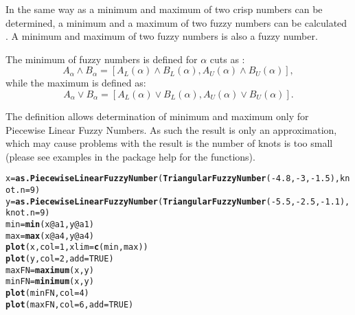 \documentclass[11pt]{article}\usepackage[]{graphicx}\usepackage[]{color}
\makeatletter
\newcommand{\hlnum}[1]{\textcolor[rgb]{0.686,0.059,0.569}{#1}}%
\newcommand{\hlopt}[1]{\textcolor[rgb]{0,0,0}{#1}}%
\newcommand{\hlstd}[1]{\textcolor[rgb]{0.345,0.345,0.345}{#1}}%
\newcommand{\hlkwb}[1]{\textcolor[rgb]{0.69,0.353,0.396}{#1}}%
\newcommand{\hlkwc}[1]{\textcolor[rgb]{0.333,0.667,0.333}{#1}}%
\newcommand{\hlkwd}[1]{\textcolor[rgb]{0.737,0.353,0.396}{\textbf{#1}}}%
\newenvironment{kframe}{%
 \def\at@end@of@kframe{}%
 \ifinner\ifhmode%
  \def\at@end@of@kframe{\end{minipage}}%
  \begin{minipage}{\columnwidth}%
 \fi\fi%
 \def\FrameCommand##1{\hskip\@totalleftmargin \hskip-\fboxsep
 \colorbox{shadecolor}{##1}\hskip-\fboxsep
     \hskip-\linewidth \hskip-\@totalleftmargin \hskip\columnwidth}%
 \MakeFramed {\advance\hsize-\width
   \@totalleftmargin\z@ \linewidth\hsize
   \@setminipage}}%
 {\par\unskip\endMakeFramed%
 \at@end@of@kframe}
\newenvironment{knitrout}{}{} %
\makeatother
\begin{document}
In the same way as a minimum and maximum of two crisp numbers can be determined, a minimum and a maximum of two fuzzy numbers can be calculated \cite{KaufmannGupta1985:fuzzybook}. A minimum and maximum of two fuzzy numbers is also a fuzzy number.

The minimum of fuzzy numbers is defined for $\alpha$ cuts as \cite{KaufmannGupta1985:fuzzybook}:
\begin{equation}
A_\alpha \wedge B_\alpha = [A_L(\alpha) \wedge B_L(\alpha), A_U(\alpha) \wedge B_U(\alpha)],
\end{equation}
while the maximum is defined as:
\begin{equation}
A_\alpha \vee B_\alpha = [A_L(\alpha) \vee B_L(\alpha), A_U(\alpha) \vee B_U(\alpha)].
\end{equation}


The definition allows determination of minimum and maximum only for Piecewise Linear Fuzzy Numbers. As such the result is only an approximation, which may cause problems with the result is the number of knots is too small (please see examples in the package help for the functions).

\begin{knitrout}\small
{}\color{fgcolor}\begin{kframe}
\begin{alltt}
\hlstd{x} \hlkwb{=} \hlkwd{as.PiecewiseLinearFuzzyNumber}\hlstd{(}\hlkwd{TriangularFuzzyNumber}\hlstd{(}\hlopt{-}\hlnum{4.8}\hlstd{,} \hlopt{-}\hlnum{3} \hlstd{,} \hlopt{-}\hlnum{1.5}\hlstd{),} \hlkwc{knot.n} \hlstd{=} \hlnum{9}\hlstd{)}
\hlstd{y} \hlkwb{=} \hlkwd{as.PiecewiseLinearFuzzyNumber}\hlstd{(}\hlkwd{TriangularFuzzyNumber}\hlstd{(}\hlopt{-}\hlnum{5.5}\hlstd{,} \hlopt{-}\hlnum{2.5}\hlstd{,} \hlopt{-}\hlnum{1.1}\hlstd{),} \hlkwc{knot.n} \hlstd{=} \hlnum{9}\hlstd{)}
\hlstd{min} \hlkwb{=} \hlkwd{min}\hlstd{(x}\hlopt{@}\hlkwc{a1}\hlstd{,y}\hlopt{@}\hlkwc{a1}\hlstd{)}
\hlstd{max} \hlkwb{=} \hlkwd{max}\hlstd{(x}\hlopt{@}\hlkwc{a4}\hlstd{,y}\hlopt{@}\hlkwc{a4}\hlstd{)}
\hlkwd{plot}\hlstd{(x,} \hlkwc{col}\hlstd{=}\hlnum{1}\hlstd{,} \hlkwc{xlim} \hlstd{=} \hlkwd{c}\hlstd{(min,max))}
\hlkwd{plot}\hlstd{(y,} \hlkwc{col}\hlstd{=}\hlnum{2}\hlstd{,} \hlkwc{add}\hlstd{=}\hlnum{TRUE}\hlstd{)}
\hlstd{maxFN} \hlkwb{=} \hlkwd{maximum}\hlstd{(x,y)}
\hlstd{minFN} \hlkwb{=} \hlkwd{minimum}\hlstd{(x,y)}
\hlkwd{plot}\hlstd{(minFN,} \hlkwc{col}\hlstd{=}\hlnum{4}\hlstd{)}
\hlkwd{plot}\hlstd{(maxFN,} \hlkwc{col}\hlstd{=}\hlnum{6}\hlstd{,} \hlkwc{add}\hlstd{=}\hlnum{TRUE}\hlstd{)}
\end{alltt}
\end{kframe}
\end{knitrout}
\end{document}
